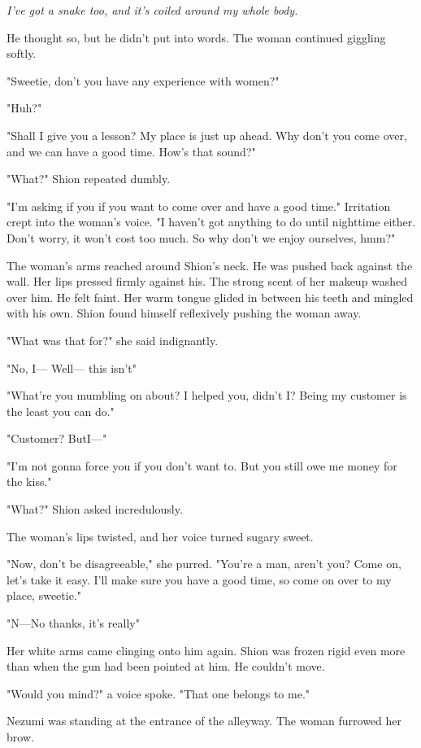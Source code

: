 \emph{I've got a snake too, and it's coiled around my whole body.}

He thought so, but he didn't put into words. The woman continued
giggling softly.

"Sweetie, don't you have any experience with women?"

"Huh?"

"Shall I give you a lesson? My place is just up ahead. Why don't you
come over, and we can have a good time. How's that sound?"

"What?" Shion repeated dumbly.

"I'm asking if you if you want to come over and have a good time."
Irritation crept into the woman's voice. "I haven't got anything to do
until nighttime either. Don't worry, it won't cost too much. So why
don't we enjoy ourselves, hmm?"

The woman's arms reached around Shion's neck. He was pushed back against
the wall. Her lips pressed firmly against his. The strong scent of her
makeup washed over him. He felt faint. Her warm tongue glided in between
his teeth and mingled with his own. Shion found himself reflexively
pushing the woman away.

"What was that for?" she said indignantly.

"No, I--- Well--- this isn't\el "

"What're you mumbling on about? I helped you, didn't I? Being my
customer is the least you can do."

"Customer? But\el I---"

"I'm not gonna force you if you don't want to. But you still owe me
money for the kiss."

"What?" Shion asked incredulously.

The woman's lips twisted, and her voice turned sugary sweet.

"Now, don't be disagreeable," she purred. "You're a man, aren't you?
Come on, let's take it easy. I'll make sure you have a good time, so
come on over to my place, sweetie."

"N---No thanks, it's really\el "

Her white arms came clinging onto him again. Shion was frozen rigid even
more than when the gun had been pointed at him. He couldn't move.

"Would you mind?" a voice spoke. "That one belongs to me."

Nezumi was standing at the entrance of the alleyway. The woman furrowed
her brow.

